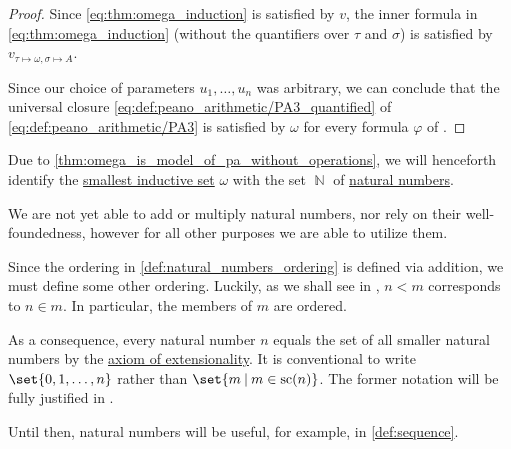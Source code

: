 \begin{proof}
  Since \eqref{eq:thm:omega_induction} is satisfied by \( v \), the inner formula in \eqref{eq:thm:omega_induction} (without the quantifiers over \( \tau \) and \( \sigma \)) is satisfied by \( v_{\tau \mapsto \omega, \sigma \mapsto A} \).

  Since our choice of parameters \( u_1, \ldots, u_n \) was arbitrary, we can conclude that the universal closure \eqref{eq:def:peano_arithmetic/PA3_quantified} of \eqref{eq:def:peano_arithmetic/PA3} is satisfied by \( \omega \) for every formula \( \varphi \) of .
\end{proof}

\begin{remark}\label{rem:set_theory_natural_numbers_without_operations}
  Due to \cref{thm:omega_is_model_of_pa_without_operations}, we will henceforth identify the \hyperref[thm:smallest_inductive_set_existence]{smallest inductive set} \( \omega \) with the set \( \BbbN \) of \hyperref[def:natural_numbers]{natural numbers}.

  We are not yet able to add or multiply natural numbers, nor rely on their well-foundedness, however for all other purposes we are able to utilize them.

  Since the ordering in \cref{def:natural_numbers_ordering} is defined via addition, we must define some other ordering. Luckily, as we shall see in , \( n < m \) corresponds to \( n \in m \). In particular, the members of \( m \) are ordered.

  As a consequence, every natural number \( n \) equals the set of all smaller natural numbers by the \hyperref[def:naive_set_theory/extensionality]{axiom of extensionality}. It is conventional to write \( \set{ 0, 1, \ldots, n } \) rather than \( \set{ m \given m \in \op{sc}(n) } \). The former notation will be fully justified in .

  Until then, natural numbers will be useful, for example, in \cref{def:sequence}.
\end{remark}
